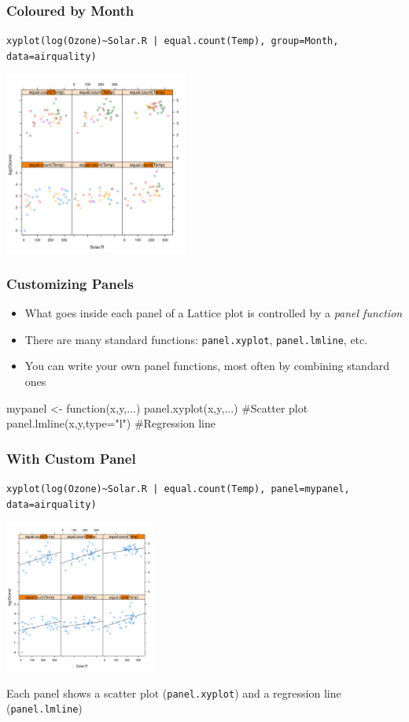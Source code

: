 \documentclass[xcolor=svgnames]{beamer}
\newcommand{\code}[1]{\texttt{#1}}
\let\overbatim\verbatim
\let\endoverbatim\endverbatim
\newenvironment{vcode}%
{\bgroup\baselineskip=0.8\baselineskip\overbatim}%
{\endoverbatim\egroup}
\begin{document}
\begin{frame}
   \frametitle{Coloured by Month}
   \code{xyplot(log(Ozone)\textasciitilde Solar.R | equal.count(Temp), group=Month, data=airquality)}

   \centerline{\includegraphics[width=6cm]{ozone3.pdf}}
\end{frame}

\begin{frame}[fragile]
  \frametitle{Customizing Panels}
  \begin{itemize}
  \item What goes inside each panel of a Lattice plot is controlled by
    a \emph{panel function}
  \item There are many standard functions: \code{panel.xyplot},
    \code{panel.lmline}, etc.
 \item You can write your own panel functions, most often by
    combining standard ones
  \end{itemize}
  \begin{vcode}
  mypanel <- function(x,y,...){
     panel.xyplot(x,y,...) #Scatter plot
     panel.lmline(x,y,type="l") #Regression line
  }
  \end{vcode}
\end{frame}

\begin{frame}
   \frametitle{With Custom Panel}
   \code{xyplot(log(Ozone)\textasciitilde Solar.R | equal.count(Temp), 
         panel=mypanel, data=airquality)}
   \centerline{\includegraphics[width=5cm]{ozone4.pdf}}

   Each panel shows a scatter plot (\code{panel.xyplot}) and a regression
   line (\code{panel.lmline})
\end{frame}
\end{document}
